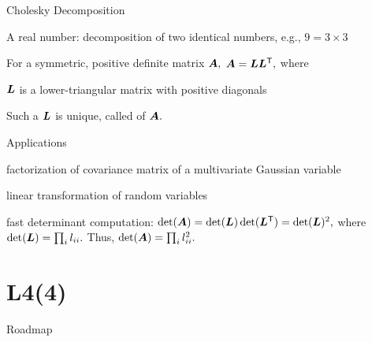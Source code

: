 \documentclass[fleqn,aspectratio=169]{beamer}
\begin{document}
\begin{frame}{Cholesky Decomposition}

\plitemsep 0.1in

\bci

\item A real number: decomposition of two identical numbers, e.g., $9=3\times 3$

\item \thm For a symmetric, positive definite matrix $\bm{A},$ $\bm{A} = \bm{L}{\bm{L}}^{\mathsf{T}},$ where
\bci
\item $\bm{L}$ is a lower-triangular matrix with positive diagonals
\item Such a $\bm{L}$ is unique, called  of $\bm{A}.$
\eci

\item Applications
\bce[(a)]
\item factorization of covariance matrix of a multivariate Gaussian variable
\item linear transformation of random variables
\item fast determinant computation: $\det(\bm{A}) = \det(\bm{L})\det({\bm{L}}^{\mathsf{T}}) = \det(\bm{L})^2,$ where $\det(\bm{L}) = \prod_{i} l_{ii}.$ Thus, $\det(\bm{A}) = \prod_{i} l_{ii}^2.$
\ece
\eci

\end{frame}



\section{L4(4)}
\begin{frame}{Roadmap}

\plitemsep 0.1in

\bce[(1)] 
\item {}

\item {}

\item {}

\item {}

\item {}

\ece
\end{frame}
\end{document}
